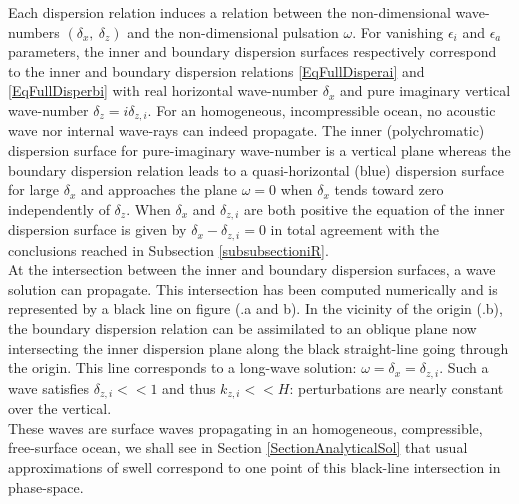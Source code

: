 \documentclass[a4paper,11pt]{article}
\begin{document}
Each dispersion relation induces a relation between the non-dimensional wave-numbers $(\delta_x,\ \delta_z)$ and the non-dimensional pulsation $\omega$. For vanishing $\epsilon_i$ and $\epsilon_a$ parameters, the inner and boundary dispersion surfaces respectively correspond to the inner and boundary dispersion relations \ref{EqFullDisperai} and \ref{EqFullDisperbi} with real horizontal wave-number $\delta_x$ and pure imaginary vertical wave-number $\delta_z=i\delta_{z,i}$. For an homogeneous, incompressible ocean, no acoustic wave nor internal wave-rays can indeed propagate.
The inner (polychromatic) dispersion surface for pure-imaginary wave-number is a vertical plane whereas the boundary dispersion relation leads to a quasi-horizontal (blue) dispersion surface for large $\delta_x$ and approaches the plane $\omega=0$ when $\delta_x$ tends toward zero independently of $\delta_z$. When $\delta_x$ and $\delta_{z,i}$ are both positive the equation of the inner dispersion surface is given by $\delta_x-\delta_{z,i} =0$ in total agreement with the conclusions reached in Subsection \ref{subsubsectioniR}.\\
At the intersection between the inner and boundary dispersion surfaces, a wave solution can propagate. This intersection has been computed numerically and is represented by a black line on figure (.a and b).
In the vicinity of the origin (.b), the boundary dispersion relation can be assimilated to an oblique plane now intersecting the inner dispersion plane along the black straight-line going through the origin. This line corresponds to a long-wave solution: $\omega=\delta_x=\delta_{z,i}$. Such a wave satisfies $\delta_{z,i}<<1$ and thus $k_{z,i}<<H$: perturbations are nearly constant over the vertical.\\
These waves are surface waves propagating in an homogeneous, compressible, free-surface ocean, we shall see in Section \ref{SectionAnalyticalSol} that usual approximations of swell correspond to one point of this black-line intersection in phase-space.
\end{document}
